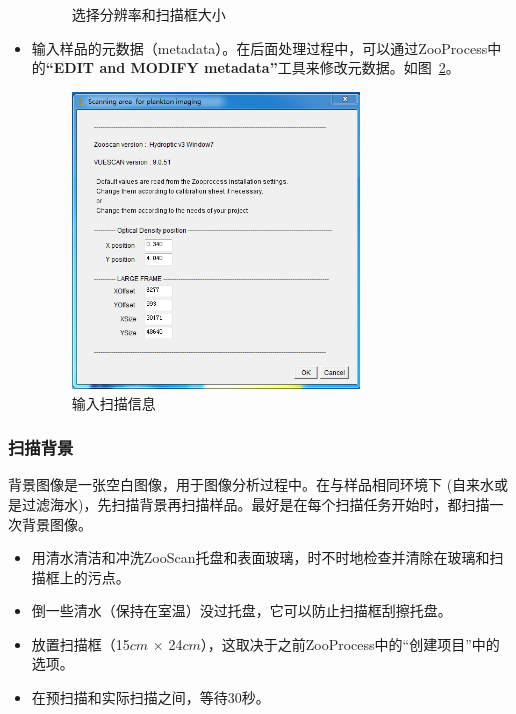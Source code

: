 \documentclass[12pt]{article}
\begin{document}
\begin{itemize}
\begin{figure}[!ht]
    \caption{选择分辨率和扫描框大小}
    \label{fig:frame}
    \end{figure}
\item 输入样品的元数据（metadata）。在后面处理过程中，可以通过ZooProcess中的\textbf{``EDIT and MODIFY metadata''}工具来修改元数据。如图~\ref{fig:metadata}。
    \begin{figure}[!ht]
    \centering
    \includegraphics[width=3.0in]{metadata}
    \caption{输入扫描信息}
    \label{fig:metadata}
    \end{figure}
\end{itemize}


\subsubsection{扫描背景}
背景图像是一张空白图像，用于图像分析过程中。在与样品相同环境下 (自来水或是过滤海水)，先扫描背景再扫描样品。最好是在每个扫描任务开始时，都扫描一次背景图像。
\begin{itemize}
\item 用清水清洁和冲洗ZooScan托盘和表面玻璃，时不时地检查并清除在玻璃和扫描框上的污点。
\item 倒一些清水（保持在室温）没过托盘，它可以防止扫描框刮擦托盘。
\item 放置扫描框（15$cm$ $\times$ 24$cm$），这取决于之前ZooProcess中的``创建项目''中的选项。
\item 在预扫描和实际扫描之间，等待30秒。
\end{itemize}
\end{document}
